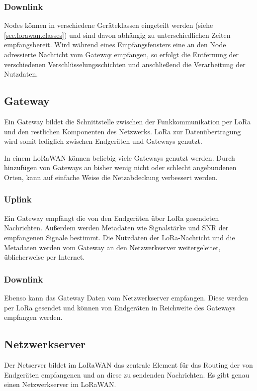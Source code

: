 \subsubsection{Downlink}
Nodes können in verschiedene Geräteklassen eingeteilt werden (siehe \autoref{sec.lorawan.classes}) und sind davon abhängig zu unterschiedlichen Zeiten empfangsbereit.
Wird während eines Empfangsfensters eine an den Node adressierte Nachricht vom Gateway empfangen, so erfolgt die Entfernung der verschiedenen Verschlüsselungsschichten und anschließend die Verarbeitung der Nutzdaten.


\subsection{Gateway}
Ein \gls{Gateway} bildet die Schnittstelle zwischen der Funkkommunikation per LoRa und den restlichen Komponenten des Netzwerks.
LoRa zur Datenübertragung wird somit lediglich zwischen Endgeräten und Gateways genutzt.

In einem LoRaWAN können beliebig viele Gateways genutzt werden.
Durch hinzufügen von Gateways an bisher wenig nicht oder schlecht angebundenen Orten, kann auf einfache Weise die Netzabdeckung verbessert werden.


\subsubsection{Uplink}
Ein Gateway empfängt die von den Endgeräten über LoRa gesendeten Nachrichten.
Außerdem werden Metadaten wie Signalstärke und \gls{SNR} der empfangenen Signale bestimmt.
Die Nutzdaten der LoRa-Nachricht und die Metadaten werden vom Gateway an den Netzwerkserver weitergeleitet, üblicherweise per Internet.

\subsubsection{Downlink}
Ebenso kann das Gateway Daten vom Netzwerkserver empfangen.
Diese werden per LoRa gesendet und können von Endgeräten in Reichweite des Gateways empfangen werden.


\subsection{Netzwerkserver}
Der \gls{Netserver} bildet im LoRaWAN das zentrale Element für das Routing der von Endgeräten empfangenen und an diese zu sendenden Nachrichten. Es gibt genau einen Netzwerkserver im LoRaWAN.

